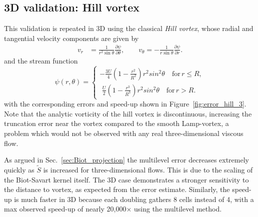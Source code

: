 \documentclass[preprint,12pt]{elsarticle}
\begin{document}
\subsection{3D validation: Hill vortex}

This validation is repeated in 3D using the classical \emph{Hill vortex}, whose radial and tangential velocity components are given by
\begin{align}
    v_r &= \frac{1}{r^2\sin\theta}\frac{\partial\psi}{\partial\theta}, \qquad v_\theta = -\frac{1}{r\sin\theta}\frac{\partial\psi}{\partial r}.
\end{align}
and the stream function 
\begin{equation}
    \psi(r,\theta) = \begin{cases}
    -\frac{3U}{4}\left(1-\frac{r^2}{R^2}\right)r^2sin^2\theta \quad \text{for} \, r \le R,\\
     \,\,\frac{U}{2}\left(1-\frac{r^3}{R^3}\right)r^2sin^2\theta \quad \text{for} \, r > R.
    \end{cases}
\end{equation}
with the corresponding errors and speed-up shown in Figure~\ref{fig:error_hill_3}. Note that the analytic vorticity of the hill vortex is discontinuous, increasing the truncation error near the vortex compared to the smooth Lamp-vortex, a problem which would not be observed with any real three-dimensional viscous flow.

As argued in Sec.~\ref{sec:Biot_projection} the multilevel error decreases extremely quickly as $\tilde{S}$ is increased for three-dimensional flows. This is due to the scaling of the Biot-Savart kernel itself. The 3D case demonstrates a stronger sensitivity to the distance to vortex, as expected from the error estimate. Similarly, the speed-up is much faster in 3D because each doubling gathers 8 cells instead of 4, with a max observed speed-up of nearly 20,000$\times$ using the multilevel method.
\end{document}
